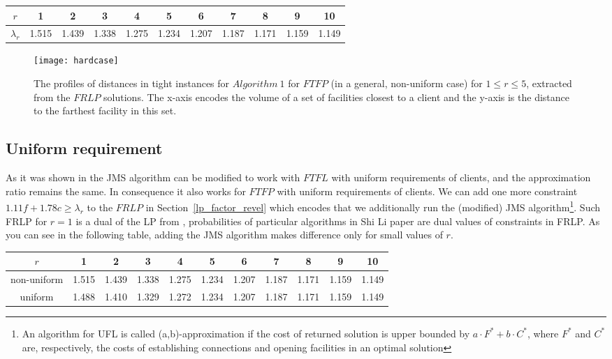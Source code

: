 \documentclass{llncs}
\begin{document}
\begin{center}
  \begin{tabular}{ c | c | c | c | c | c | c | c | c | c | c }
    $r$ & 1 & 2 & 3 & 4 & 5 & 6 & 7 & 8 & 9 & 10 \\ \hline
    $\lambda_r$ & 1.515 & 1.439 & 1.338 & 1.275 & 1.234 & 1.207 & 1.187 & 1.171 & 1.159 & 1.149 \\
  \end{tabular}
\end{center}

\begin{figure}
  \centering
  \texttt{[image: hardcase]}
 \caption{The profiles of distances in tight instances for $Algorithm~1$ for $FTFP$ (in a general, non-uniform case) for $1 \leq r \leq 5$, extracted from the $FRLP$ solutions. The x-axis encodes the volume of a set of facilities closest to a client and the y-axis is the distance to the farthest facility in this set.}
  \label{fig:hardcase}
\end{figure}

\subsection{Uniform requirement}
As it was shown in \cite{Swamy} the JMS algorithm can be modified to work with $FTFL$ with uniform requirements of clients, and the approximation ratio remains the same. In consequence it also works for $FTFP$ with uniform requirements of clients. We can add one more constraint $1.11 f + 1.78 c \geq \lambda_r$ to the $FRLP$ in Section~\ref{lp_factor_revel} which encodes that we additionally run the (modified) JMS algorithm\footnote{An algorithm for UFL is called (a,b)-approximation if the cost of returned solution is upper bounded by $a \cdot F^* + b \cdot C^*$, where $F^*$ and $C^*$ are, respectively, the costs of establishing connections and opening facilities in an optimal solution}. Such FRLP for $r = 1$ is a dual of the LP from \cite{ShiLi}, probabilities of particular algorithms in Shi Li paper are dual values of constraints in FRLP. As you can see in the following table, adding the JMS algorithm makes difference only for small values of $r$.

\begin{center}
  \begin{tabular}{ c | c | c | c | c | c | c | c | c | c | c }
    $r$ & 1 & 2 & 3 & 4 & 5 & 6 & 7 & 8 & 9 & 10 \\ \hline
    non-uniform & 1.515 & 1.439 & 1.338 & 1.275 & 1.234 & 1.207 & 1.187 & 1.171 & 1.159 & 1.149 \\ \hline
    uniform & 1.488 & 1.410 & 1.329 & 1.272 & 1.234 & 1.207 & 1.187 & 1.171 & 1.159 & 1.149 \\
  \end{tabular}
\end{center}
\end{document}
